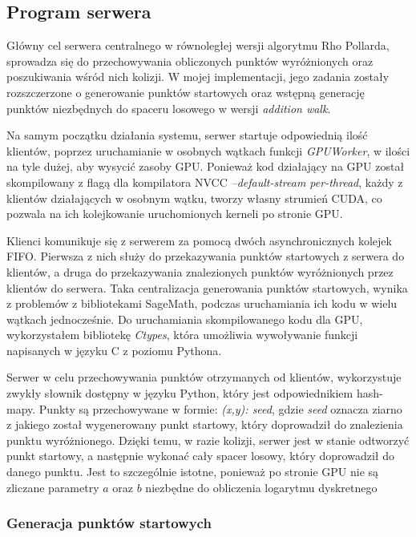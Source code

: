 \subsection{Program serwera}
Główny cel serwera centralnego w równoległej wersji algorytmu Rho Pollarda, sprowadza się do
przechowywania obliczonych punktów wyróżnionych oraz poszukiwania wśród nich kolizji.
W mojej implementacji, jego zadania zostały rozszczerzone o generowanie punktów startowych
oraz wstępną generację punktów niezbędnych do spaceru losowego w wersji \textit{addition walk}.
\par
Na samym początku działania systemu, serwer startuje odpowiednią ilość
klientów, poprzez uruchamianie w osobnych wątkach funkcji \textit{GPUWorker},
w ilości na tyle dużej, aby wysycić zasoby GPU.
Ponieważ kod działający na GPU został skompilowany z flagą dla kompilatora NVCC \textit{--default-stream per-thread},
każdy z klientów działających w osobnym wątku, tworzy własny strumień CUDA, co pozwala na ich kolejkowanie uruchomionych kerneli po stronie GPU.
\par
Klienci komunikuje się z serwerem za pomocą dwóch asynchronicznych kolejek FIFO.
Pierwsza z nich służy do przekazywania punktów startowych z serwera do klientów, a druga do przekazywania
znalezionych punktów wyróżnionych przez klientów do serwera. Taka centralizacja
generowania punktów startowych, wynika z problemów z bibliotekami SageMath,
podczas uruchamiania ich kodu w wielu wątkach jednocześnie.
Do uruchamiania skompilowanego kodu dla GPU, wykorzystałem
bibliotekę \textit{Ctypes}, która umożliwia wywoływanie funkcji napisanych w języku C z poziomu Pythona.
\par
Serwer w celu przechowywania punktów otrzymanych od klientów, wykorzystuje
zwykły słownik dostępny w języku Python, który jest odpowiednikiem hash-mapy.
Punkty są przechowywane w formie: \textit{(x,y): seed}, gdzie \textit{seed} oznacza
ziarno z jakiego został wygenerowany punkt startowy, który doprowadził do znalezienia punktu wyróżnionego.
Dzięki temu, w razie kolizji, serwer jest w stanie odtworzyć punkt startowy, a następnie wykonać cały spacer losowy, który doprowadził do danego punktu.
Jest to szczególnie istotne, ponieważ po stronie GPU nie są zliczane parametry $a$ oraz $b$ niezbędne do obliczenia
logarytmu dyskretnego

\subsubsection*{Generacja punktów startowych}

